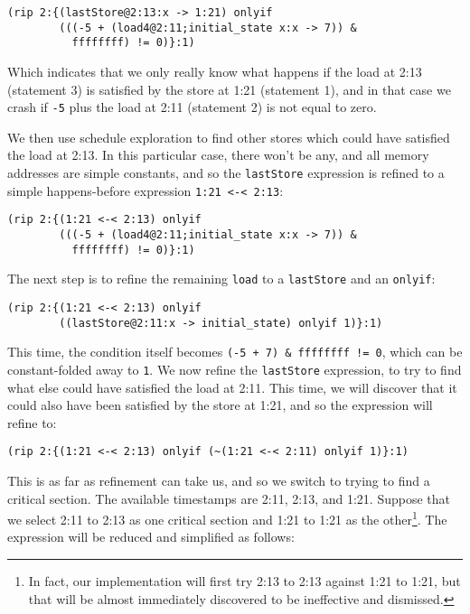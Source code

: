 \documentclass[10pt,a4paper]{report}
\begin{document}
\begin{verbatim}
(rip 2:{(lastStore@2:13:x -> 1:21) onlyif
        (((-5 + (load4@2:11;initial_state x:x -> 7)) &
          ffffffff) != 0)}:1)
\end{verbatim}

Which indicates that we only really know what happens if the load at
2:13 (statement 3) is satisfied by the store at 1:21 (statement 1),
and in that case we crash if \verb|-5| plus the load at 2:11
(statement 2) is not equal to zero.

We then use schedule exploration to find other stores which could have
satisfied the load at 2:13.  In this particular case, there won't be
any, and all memory addresses are simple constants, and so the
\verb|lastStore| expression is refined to a simple happens-before
expression \verb|1:21 <-< 2:13|:

\begin{verbatim}
(rip 2:{(1:21 <-< 2:13) onlyif
        (((-5 + (load4@2:11;initial_state x:x -> 7)) &
          ffffffff) != 0)}:1)
\end{verbatim}

The next step is to refine the remaining \verb|load| to a
\verb|lastStore| and an \verb|onlyif|:

\begin{verbatim}
(rip 2:{(1:21 <-< 2:13) onlyif
        ((lastStore@2:11:x -> initial_state) onlyif 1)}:1)
\end{verbatim}

This time, the condition itself becomes
\verb|(-5 + 7) & ffffffff != 0|, which can be constant-folded away to
\verb|1|.  We now refine the \verb|lastStore| expression, to try to
find what else could have satisfied the load at 2:11.  This time, we
will discover that it could also have been satisfied by the store at
1:21, and so the expression will refine to:

\begin{verbatim}
(rip 2:{(1:21 <-< 2:13) onlyif (~(1:21 <-< 2:11) onlyif 1)}:1)
\end{verbatim}

This is as far as refinement can take us, and so we switch to trying
to find a critical section.  The available timestamps are 2:11, 2:13,
and 1:21.  Suppose that we select 2:11 to 2:13 as one critical section
and 1:21 to 1:21 as the other\footnote{In fact, our implementation
  will first try 2:13 to 2:13 against 1:21 to 1:21, but that will be
  almost immediately discovered to be ineffective and dismissed.}.
The expression will be reduced and simplified as follows:
\end{document}
